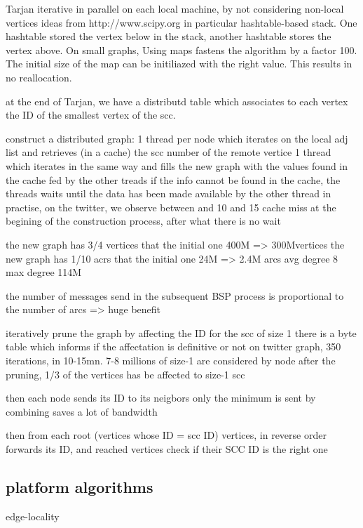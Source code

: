 \documentclass[11pt,a4paper]{article}
\begin{document}
Tarjan iterative in parallel on each local machine, by not considering non-local vertices
ideas from http://www.scipy.org
in particular hashtable-based stack. One hashtable stored the vertex below in the stack, another hashtable stores the vertex above.
On small graphs, Using maps fastens the algorithm by a factor 100. The initial size of the map can be initiliazed with the right value. This results in no reallocation.

at the end of Tarjan, we have a distributd table which associates to each vertex the ID of the smallest vertex of the scc.

construct a distributed graph:
1 thread per node which iterates on the local adj list and retrieves (in a cache) the scc number of the remote vertice
1 thread which iterates in the same way and fills the new graph with the values found in the cache fed by the other treads
if the info cannot be found in the cache, the threads waits until the data has been made available by the other thread
in practise, on the twitter, we observe between and 10 and 15 cache miss at the begining of the construction process, after what there  is no wait

the new graph has 3/4 vertices  that the initial one  400M =>  300Mvertices
the new graph has 1/10 acrs  that the initial one 24M => 2.4M arcs
avg degree  8
max degree 114M

the number of messages send in the subsequent BSP process is proportional to the number of arcs
=> huge benefit

iteratively prune the graph by affecting the ID for the scc of size 1
there is a byte table which informs if the affectation is definitive or not
on twitter graph, 350 iterations, in 10-15mn.
7-8 millions of size-1 are considered by node
after the pruning, 1/3 of the vertices has be affected to size-1 scc

then each node sends its ID to its neigbors
only the minimum is sent by combining saves a lot of bandwidth

then from each root (vertices whose ID = scc ID) vertices, in reverse order forwards its ID, and reached vertices check if their SCC ID is the right one











\subsection{platform algorithms}
edge-locality
\end{document}
